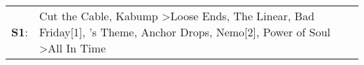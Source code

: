 \begin{supertabular}{p{0.03\textwidth}p{0.92\textwidth}}
 \textbf{S1}:  &  Cut the Cable\textsuperscript{}, \enspace Kabump\textsuperscript{} \textgreater \enspace Loose Ends\textsuperscript{}, \enspace The Linear\textsuperscript{}, \enspace Bad Friday[1]\textsuperscript{}, 's Theme\textsuperscript{}, \enspace Anchor Drops\textsuperscript{}, \enspace Nemo[2]\textsuperscript{}, \enspace Power of Soul\textsuperscript{} \textgreater \enspace All In Time\textsuperscript{}  \enspace  \\
\end{supertabular}
